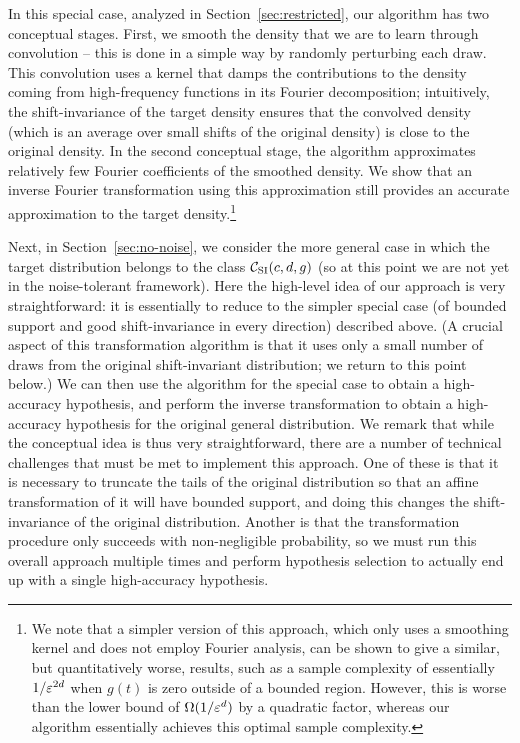 In this special case, analyzed in Section~\ref{sec:restricted}, our algorithm has two conceptual stages.  First, we smooth the density that we are to learn through convolution -- this is done in a simple way by randomly perturbing each draw.  This convolution
uses a kernel that damps the contributions to the density coming from 
high-frequency functions in its Fourier decomposition; intuitively, the shift-invariance of the target density ensures
that the convolved density (which is an average over small shifts of the original density) is close to the original density.
In the second conceptual stage,
the algorithm approximates relatively few Fourier coefficients of the smoothed density.  We show that an
inverse Fourier transformation using this approximation still provides an accurate approximation to
the target density.\footnote{We note that a simpler version of this approach, which only uses a smoothing kernel and does not employ Fourier analysis, can be shown to give a 
similar, but quantitatively worse,
results, such as a sample complexity of essentially $1/\varepsilon^{2d}$ when $g(t)$ is zero outside of a bounded region.  However, this is worse than the lower bound of $\Omega(1/\varepsilon^{d})$ by a quadratic factor, whereas our algorithm essentially achieves this optimal sample complexity.}

Next, in Section~\ref{sec:no-noise}, we consider the more general case in which the target distribution belongs to the class ${\mathcal C}_{\mathrm{SI}}(c,d,g)$ (so at this point we are not yet in the noise-tolerant framework).  Here the high-level idea of our approach is very straightforward:  it is essentially to reduce to the simpler special case (of bounded support and good shift-invariance in every direction) described above.  
(A crucial aspect of this transformation algorithm is that it uses only a small number of draws from the original shift-invariant distribution; we return to this point below.)  We can then use the algorithm for the special case to obtain a high-accuracy hypothesis, and perform the inverse transformation to obtain a high-accuracy hypothesis for the original general distribution.  We remark that while the conceptual idea is thus very straightforward, there are a number of technical challenges that must be met to implement this approach.  One of these is that it is necessary to truncate the tails of the original distribution so that an affine transformation of it will have bounded support, and doing this changes the shift-invariance of the original distribution.  Another is that the transformation procedure only succeeds with non-negligible probability, so we must run this overall approach multiple times and perform hypothesis selection to actually end up with a single high-accuracy hypothesis.  

